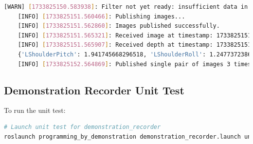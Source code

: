 \documentclass{CSSRforAfrica}
\begin{document}
\begin{itemize}
\begin{lstlisting}[style=withoutNumbering, language=bash]
    [WARN] [1733825150.583938]: Filter not yet ready: insufficient data in window
    [INFO] [1733825151.560466]: Publishing images...
    [INFO] [1733825151.562860]: Images published successfully.
    [INFO] [1733825151.565321]: Received image at timestamp: 1733825151560360193
    [INFO] [1733825151.565907]: Received depth at timestamp: 1733825151560360193
    {'LShoulderPitch': 1.941745668296518, 'LShoulderRoll': 1.2477372386287904, 'LElbowRoll': -0.30491699983987486, 'LElbowYaw': -2.803759898660347, 'LWristYaw': 0, 'RShoulderPitch': 1.9526899036771832, 'RShoulderRoll': -1.079199719003931, 'RElbowRoll': 0.33249978758958854, 'RElbowYaw': -2.528508713797143, 'RWristYaw': 0}
    [INFO] [1733825152.564869]: Published single pair of images 3 times. Shutting down.
    \end{lstlisting}   
\end{itemize}


\subsection*{Demonstration Recorder Unit Test}
To run the unit test:
\begin{lstlisting}[style=withoutNumbering, language=bash]
# Launch unit test for demonstration_recorder
roslaunch programming_by_demonstration demonstration_recorder.launch unit_test:=true
\end{lstlisting}
\end{document}
